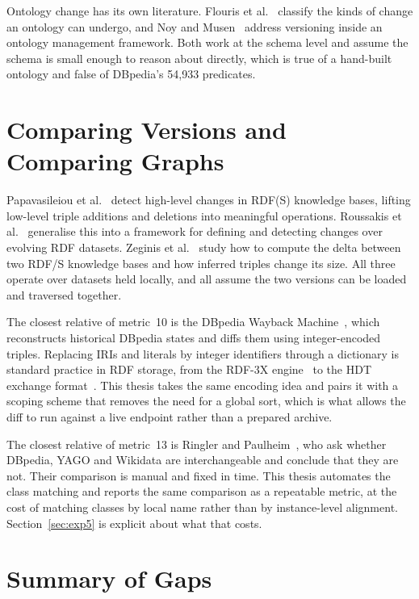 Ontology change has its own literature. Flouris et
al.~\cite{flouris2008ontology} classify the kinds of change an ontology can
undergo, and Noy and Musen~\cite{noy2004ontology} address versioning inside an
ontology management framework. Both work at the schema level and assume the
schema is small enough to reason about directly, which is true of a hand-built
ontology and false of DBpedia's 54{,}933 predicates.

\section{Comparing Versions and Comparing Graphs}
\label{sec:rw_comparison}

Papavasileiou et al.~\cite{papavasileiou2013high} detect high-level changes in
RDF(S) knowledge bases, lifting low-level triple additions and deletions into
meaningful operations. Roussakis et al.~\cite{roussakis2015flexible} generalise
this into a framework for defining and detecting changes over evolving RDF
datasets. Zeginis et al.~\cite{zeginis2011deltas} study how to compute the
delta between two RDF/S knowledge bases and how inferred triples change its
size. All three operate over datasets held locally, and all assume the two
versions can be loaded and traversed together.

The closest relative of metric~10 is the DBpedia Wayback
Machine~\cite{fernandez2015dbpedia}, which reconstructs historical DBpedia states
and diffs them using integer-encoded triples. Replacing IRIs and literals by
integer identifiers through a dictionary is standard practice in RDF storage,
from the RDF-3X engine~\cite{neumann2010rdf3x} to the HDT exchange
format~\cite{fernandez2013hdt}. This thesis takes the same encoding
idea and pairs it with a scoping scheme that removes the need for a global sort,
which is what allows the diff to run against a live endpoint rather than a
prepared archive.

The closest relative of metric~13 is Ringler and
Paulheim~\cite{ringler2017one}, who ask whether DBpedia, YAGO and Wikidata are
interchangeable and conclude that they are not. Their comparison is manual and
fixed in time. This thesis automates the class matching and reports the same
comparison as a repeatable metric, at the cost of matching classes by local name
rather than by instance-level alignment. Section~\ref{sec:exp5} is explicit about
what that costs.

\section{Summary of Gaps}
\label{sec:rw_gaps}

